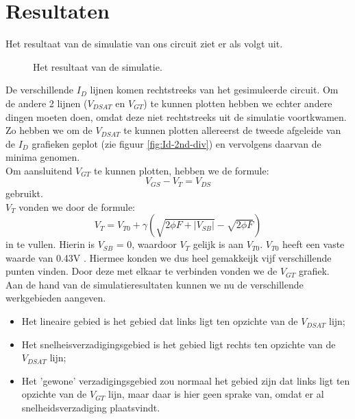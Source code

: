 \documentclass{scrartcl}  %
\begin{document}
\section{Resultaten}
Het resultaat van de simulatie van ons circuit ziet er als volgt uit.
\begin{figure}[H]
\centering
	\setlength{} 
	\setlength{}
	
	\caption{Het resultaat van de simulatie.}
	\label{fig:Id}
\end{figure}
De verschillende $I_{D}$ lijnen komen rechtstreeks van het gesimuleerde circuit. 
Om de andere 2 lijnen ($V_{DSAT}$ en $V_{GT}$) te kunnen plotten hebben we echter andere dingen moeten doen, omdat deze niet rechtstreeks uit de simulatie voortkwamen. 
Zo hebben we om de $V_{DSAT}$ te kunnen plotten allereerst de tweede afgeleide van de $I_{D}$ grafieken geplot (zie figuur \ref{fig:Id-2nd-div}) en vervolgens daarvan de minima genomen. 
\\
Om aansluitend $V_{GT}$ te kunnen plotten, hebben we de formule: 
\begin{equation}
V_{GS} - V_{T} = V_{DS} 
\end{equation} gebruikt.\\
$V_{T}$ vonden we door de formule: 
\begin{equation}
V_{T} = V_{T0} + \gamma (\sqrt {2 \phi F + |V_{SB}|} - \sqrt{ 2 \phi F} ) 
\end{equation} in te vullen. 
Hierin is $V_{SB}$ = 0, waardoor $V_{T}$  gelijk is aan $V_{T0}$. 
$V_{T0}$ heeft een vaste waarde van 0.43V \cite[103]{rabaey-integrated-circuits}. 
Hiermee konden we dus heel gemakkeijk vijf verschillende punten vinden. 
Door deze met elkaar te verbinden vonden we de $V_{GT}$ grafiek. 
\\
Aan de hand van de simulatieresultaten kunnen we nu de verschillende werkgebieden aangeven.
\begin{itemize}
	\item Het lineaire gebied is het gebied dat links ligt ten opzichte van de $V_{DSAT}$ lijn;
	\item Het snelheisverzadigingsgebied is het gebied ligt rechts ten opzichte van de $V_{DSAT}$ lijn;
	\item Het 'gewone' verzadigingsgebied zou normaal het gebied zijn dat links ligt ten opzichte van de $V_{GT}$ lijn, maar daar is hier geen sprake van, omdat er al snelheidsverzadiging plaatsvindt.
\end{itemize}
\end{document}
